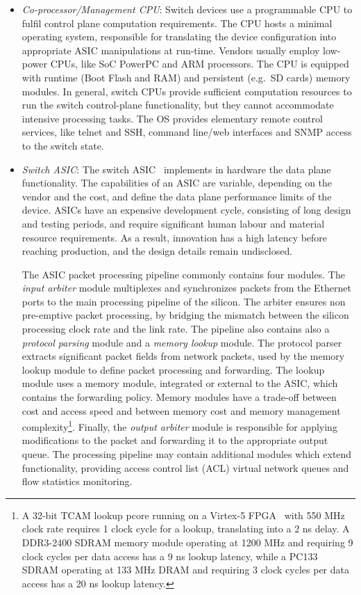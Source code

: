 \begin{itemize}
  \item \emph{Co-processor/Management CPU}: Switch devices use a programmable
    CPU to fulfil control plane computation requirements. The CPU hosts a
    minimal operating system, responsible for translating the device configuration into
    appropriate ASIC manipulations at run-time. Vendors usually employ low-power CPUs, like SoC
    PowerPC and ARM processors. The CPU is equipped with runtime
    (Boot Flash and RAM) and persistent (e.g.~SD cards) memory modules. In general,
    switch CPUs provide sufficient computation resources to run the switch
    control-plane functionality, but they cannot accommodate intensive processing
    tasks. The OS provides elementary remote control services, like telnet and SSH,
    command line/web interfaces and SNMP access to the switch state. 
 
  \item \emph{Switch ASIC}: The switch ASIC~
    implements in hardware the data plane functionality. The capabilities of
    an ASIC are variable, depending on the vendor and the cost, and define the data
    plane performance limits of the device.  ASICs have an expensive
    development cycle, consisting of long design and
    testing periods, and require significant human labour and material resource
    requirements. As a result, innovation has a high latency before
    reaching production, and the design details remain undisclosed.  

    The ASIC packet processing pipeline commonly contains four modules.  The
    \emph{input arbiter} module multiplexes and synchronizes packets from the
    Ethernet ports to the main processing pipeline of the silicon. The arbiter
    ensures non pre-emptive packet processing, by bridging the mismatch
    between the silicon processing clock rate and the link rate. The pipeline also 
    contains also a \emph{protocol parsing} module and a
    \emph{memory lookup} module. The protocol parser extracts significant packet
    fields from network packets, used by the memory lookup module
    to define packet processing and forwarding.  The lookup module
    uses a memory module, integrated or external to the ASIC, which contains 
    the forwarding policy.  Memory modules have a trade-off
    between cost and access speed and between memory cost and memory management
    complexity\footnote{A 32-bit TCAM lookup pcore running on a Virtex-5 FPGA~\cite{virtex5}
    with 550 MHz clock rate requires 1 clock cycle for a lookup, translating into a 2 ns
    delay. A DDR3-2400 SDRAM memory module operating at 1200 MHz and requiring
    9 clock cycles per data access has a 9 ns lookup latency, while a PC133
    SDRAM operating at 133 MHz DRAM and requiring 3 clock cycles per data
    access has a 20 ns lookup latency.}.
    Finally, the \emph{output arbiter} module is responsible for applying
    modifications to the packet and forwarding it to the appropriate output
    queue. The processing pipeline may contain additional modules which extend
    functionality, providing access control list (ACL) virtual network queues
    and flow statistics monitoring.


\end{itemize}
